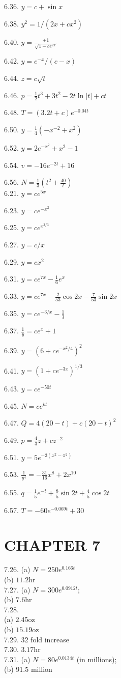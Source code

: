 \documentclass[10pt]{article}
\begin{document}
6.36. $y=c+\sin x$

6.38. $y^{2}=1 /\left(2 x+c x^{2}\right)$

6.40. $y=\frac{ \pm 1}{\sqrt{1-c e^{2 x}}}$

6.42. $y=e^{-x} /(c-x)$

6.44. $z=c \sqrt{t}$

6.46. $p=\frac{1}{2} t^{3}+3 t^{2}-2 t \ln |t|+c t$

6.48. $T=(3.2 t+c) e^{-0.04 t}$

6.50. $y=\frac{1}{4}\left(-x^{-2}+x^{2}\right)$

6.52. $y=2 e^{-x^{2}}+x^{2}-1$

6.54. $v=-16 e^{-2 t}+16$

6.56. $N=\frac{1}{3}\left(t^{2}+\frac{40}{t}\right)$\\
6.21. $y=c e^{5 x}$

6.23. $y=c e^{-x^{2}}$

6.25. $y=c e^{x^{3 / 3}}$

6.27. $y=c / x$

6.29. $y=c x^{2}$

6.31. $y=c e^{7 x}-\frac{1}{6} e^{x}$

6.33. $y=c e^{7 x}-\frac{2}{53} \cos 2 x-\frac{7}{53} \sin 2 x$

6.35. $y=c e^{-3 / x}-\frac{1}{3}$

6.37. $\frac{1}{y}=c e^{x}+1$

6.39. $y=\left(6+c e^{-x^{2} / 4}\right)^{2}$

6.41. $y=\left(1+c e^{-3 x}\right)^{1 / 3}$

6.43. $y=c e^{-50 t}$

6.45. $N=c e^{k t}$

6.47. $Q=4(20-t)+c(20-t)^{2}$

6.49. $p=\frac{4}{3} z+c z^{-2}$

6.51. $y=5 e^{-3\left(x^{2}-\pi^{2}\right)}$

6.53. $\frac{1}{y^{4}}=-\frac{31}{16} x^{8}+2 x^{10}$

6.55. $q=\frac{1}{5} e^{-t}+\frac{8}{5} \sin 2 t+\frac{4}{5} \cos 2 t$

6.57. $T=-60 e^{-0.069 t}+30$

\section*{CHAPTER 7}
7.26. (a) $N=250 e^{0.166 t}$\\
(b) $11.2 \mathrm{hr}$\\
7.27. (a) $N=300 e^{0.0912 t}$;\\
(b) $7.6 \mathrm{hr}$\\
7.28.\\
(a) $2.45 \mathrm{oz}$\\
(b) $15.19 \mathrm{oz}$\\
7.29. 32 fold increase\\
7.30. $3.17 \mathrm{hr}$\\
7.31. (a) $N=80 e^{0.0134 t}$ (in millions);\\
(b) 91.5 million
\end{document}
